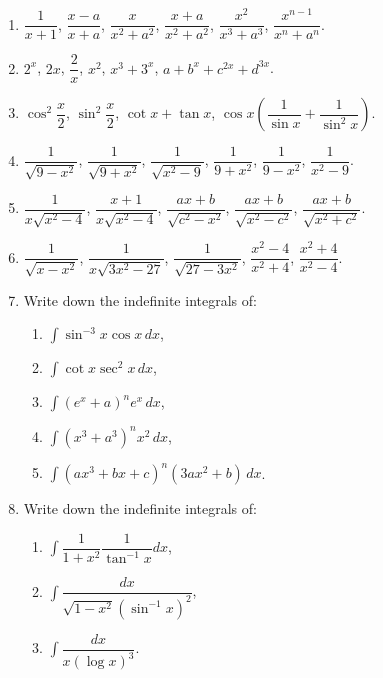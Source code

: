 \documentclass[11pt, a4paper]{article}
\begin{document}
\begin{enumerate}[leftmargin=2em]

\item $\dfrac{1}{x+1}$, $\dfrac{x-a}{x+a}$, $\dfrac{x}{x^2+a^2}$, $\dfrac{x+a}{x^2+a^2}$, $\dfrac{x^2}{x^3+a^3}$, $\dfrac{x^{n-1}}{x^n+a^n}$.

\item $2^x$, $2x$, $\dfrac{2}{x}$, $x^2$, $x^3+3^x$, $a+b^x+c^{2x}+d^{3x}$.

\item $\cos^2\dfrac{x}{2}$, $\sin^2\dfrac{x}{2}$, $\cot x + \tan x$, $\cos x\left(\dfrac{1}{\sin x}+\dfrac{1}{\sin^2 x}\right)$.

\item $\dfrac{1}{\sqrt{9-x^2}}$, $\dfrac{1}{\sqrt{9+x^2}}$, $\dfrac{1}{\sqrt{x^2-9}}$, $\dfrac{1}{9+x^2}$, $\dfrac{1}{9-x^2}$, $\dfrac{1}{x^2-9}$.

\item $\dfrac{1}{x\sqrt{x^2-4}}$, $\dfrac{x+1}{x\sqrt{x^2-4}}$, $\dfrac{ax+b}{\sqrt{c^2-x^2}}$, $\dfrac{ax+b}{\sqrt{x^2-c^2}}$, $\dfrac{ax+b}{\sqrt{x^2+c^2}}$.

\item $\dfrac{1}{\sqrt{x-x^2}}$, $\dfrac{1}{x\sqrt{3x^2-27}}$, $\dfrac{1}{\sqrt{27-3x^2}}$, $\dfrac{x^2-4}{x^2+4}$, $\dfrac{x^2+4}{x^2-4}$.

\item Write down the indefinite integrals of:
\begin{enumerate}[label=(\roman*)]
\item $\displaystyle\int \sin^{-3}x\cos x\, dx$,
\item $\displaystyle\int \cot x \sec^2 x\, dx$,
\item $\displaystyle\int (e^x+a)^n e^x\, dx$,
\item $\displaystyle\int (x^3+a^3)^n x^2\, dx$,
\item $\displaystyle\int (ax^3+bx+c)^n(3ax^2+b)\, dx$.
\end{enumerate}

\item Write down the indefinite integrals of:
\begin{enumerate}[label=(\roman*)]
\item $\displaystyle\int \dfrac{1}{1+x^2}\dfrac{1}{\tan^{-1}x}dx$,
\item $\displaystyle\int \dfrac{dx}{\sqrt{1-x^2}(\sin^{-1}x)^2}$,
\item $\displaystyle\int \dfrac{dx}{x(\log x)^3}$.
\end{enumerate}


\end{enumerate}
\end{document}
